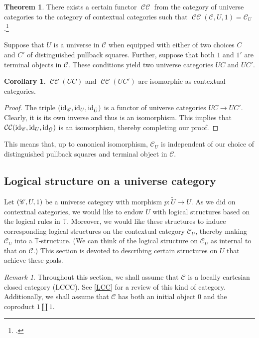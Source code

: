 \documentclass[10pt,letterpaper,cm]{nupset}
\theoremstyle{definition}
\theoremstyle{theorem}
\newtheorem{theorem}[definition]{Theorem}
\newtheorem{corollary}[definition]{Corollary}
\theoremstyle{remark}
\newtheorem{remark}[definition]{Remark}
\DeclareMathOperator{\CCop}{\mathcal{CC}}
\newcommand{\0}{\mathbf{0}}
\newcommand{\1}{\mathbf{1}}
\newcommand{\2}{\mathbf{2}}
\renewcommand{\c}{\mathscr{C}}
\newcommand{\T}{\mathbb T}
\DeclareMathOperator{\idd}{id}
\begin{document}
\begin{theorem}\label{C-U}
There exists a certain functor $\CCop$ from the category of universe categories to the category of contextual categories such that $\CCop(\c, U, 1)=\c_U$.\footnote{\autocite[Construction 4.7]{voev}.  }
\end{theorem}

Suppose that $U$ is a universe in $\c$ when equipped with either of two choices $C$ and $C'$ of distinguished pullback squares. Further, suppose that both $1$ and $1'$ are terminal objects in $\c$. These conditions yield two universe categories $\mathit{UC}$ and $\mathit{UC}'$.

\begin{corollary}
 $\CCop(\mathit{UC})$ and  $\CCop(\mathit{UC}')$ are isomorphic as contextual categories.
\end{corollary}
\begin{proof}
The triple $\mleft(\idd_{\c}, \idd_U, \idd_{\tilde{U}}\mright)$ is a functor of universe categories $\mathit{UC} \to \mathit{UC}'$. Clearly, it is its own inverse and thus is an isomorphism. This implies that $\CCop\mleft(\idd_{\c}, \idd_U, \idd_{\tilde{U}}\mright)$ is an isomorphism, thereby completing our proof.
\end{proof}

This means that, up to canonical isomorphism, $\c_{U}$ is independent of our choice of distinguished pullback squares and terminal  object in $\c$.

\subsection{Logical structure on a universe category}\label{log}

Let $\mleft(\c, U, 1\mright)$ be a universe category with morphism $p: \tilde{U} \to U$. As we did on contextual categories, we would like to endow $U$ with logical structures  based on the logical rules in $\T$. Moreover, we would like these structures to induce corresponding logical structures on the contextual category $\c_U$, thereby making $\c_U$ into a $\T$-structure. (We can think of the logical structure on $\c_U$ as internal to that on $\c$.)  This section is devoted to describing certain structures on $U$ that achieve these goals.

\smallskip

\begin{remark}
Throughout this section, we shall assume that $\c$ is a locally cartesian closed category (LCCC). See \cref{LCC} for a review of this kind of category. Additionally, we shall assume that $\c$ has both an initial object $0$ and the coproduct $1\coprod 1$.
\end{remark}
\end{document}
